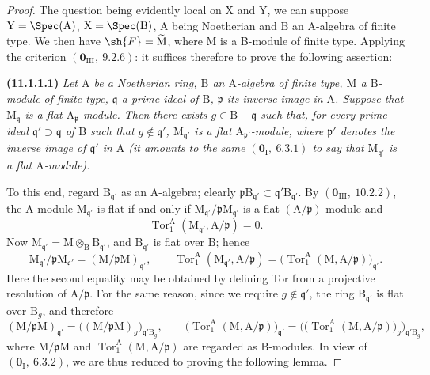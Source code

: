 \begin{proof}
The question being evidently local on $\mathrm{X}$ and $\mathrm{Y}$, we can suppose $\mathrm{Y}=\Spec(\mathrm{A})$, $\mathrm{X}=\Spec(\mathrm{B})$, $\mathrm{A}$ being Noetherian and $\mathrm{B}$ an A-algebra of finite type. We then have $\sh{F}=\widetilde{\mathrm{M}}$, where $\mathrm{M}$ is a B-module of finite type. Applying the criterion $(\mathbf{0}_{\mathrm{III}},~9.2.6)$: it suffices therefore to prove the following assertion:

\medskip
\noindent\textbf{(11.1.1.1)}
\emph{Let $\mathrm{A}$ be a Noetherian ring, $\mathrm{B}$ an $\mathrm{A}$-algebra of finite type, $\mathrm{M}$ a $\mathrm{B}$-module of finite type, $\mathfrak{q}$ a prime ideal of $\mathrm{B}$, $\mathfrak{p}$ its inverse image in $\mathrm{A}$. Suppose that $\mathrm{M}_\mathfrak{q}$ is a flat $\mathrm{A}_\mathfrak{p}$-module. Then there exists $g\in\mathrm{B}-\mathfrak{q}$ such that, for every prime ideal $\mathfrak{q}'\supset\mathfrak{q}$ of $\mathrm{B}$ such that $g\notin\mathfrak{q}'$, $\mathrm{M}_{\mathfrak{q}'}$ is a flat $\mathrm{A}_{\mathfrak{p}'}$-module, where $\mathfrak{p}'$ denotes the inverse image of $\mathfrak{q}'$ in $\mathrm{A}$ (it amounts to the same $(\mathbf{0}_\mathrm{I},~6.3.1)$ to say that $\mathrm{M}_{\mathfrak{q}'}$ is a flat $\mathrm{A}$-module).}
\medskip

To this end, regard $\mathrm{B}_{\mathfrak{q}'}$ as an $\mathrm{A}$-algebra; clearly
$\mathfrak{p}\mathrm{B}_{\mathfrak{q}'}\subset
\mathfrak{q}'\mathrm{B}_{\mathfrak{q}'}$. By
$(\mathbf{0}_{\mathrm{III}},~10.2.2)$, the $\mathrm{A}$-module
$\mathrm{M}_{\mathfrak{q}'}$ is flat if and only if
$\mathrm{M}_{\mathfrak{q}'}/\mathfrak{p}\mathrm{M}_{\mathfrak{q}'}$ is a
flat $(\mathrm{A}/\mathfrak{p})$-module and
\[
  \operatorname{Tor}_1^\mathrm{A}
  (\mathrm{M}_{\mathfrak{q}'},\mathrm{A}/\mathfrak{p})=0.
\]
Now $\mathrm{M}_{\mathfrak{q}'}=
\mathrm{M}\otimes_{\mathrm{B}}\mathrm{B}_{\mathfrak{q}'}$, and
$\mathrm{B}_{\mathfrak{q}'}$ is flat over $\mathrm{B}$; hence
\[
  \mathrm{M}_{\mathfrak{q}'}/\mathfrak{p}\mathrm{M}_{\mathfrak{q}'}
    =(\mathrm{M}/\mathfrak{p}\mathrm{M})_{\mathfrak{q}'},
  \qquad
  \operatorname{Tor}_1^\mathrm{A}
  (\mathrm{M}_{\mathfrak{q}'},\mathrm{A}/\mathfrak{p})
    =\bigl(\operatorname{Tor}_1^\mathrm{A}
      (\mathrm{M},\mathrm{A}/\mathfrak{p})\bigr)_{\mathfrak{q}'}.
\]
Here the second equality may be obtained by defining Tor from a projective
resolution of $\mathrm{A}/\mathfrak{p}$. For the same reason, since we require
$g\notin\mathfrak{q}'$, the ring $\mathrm{B}_{\mathfrak{q}'}$ is flat over
$\mathrm{B}_g$, and therefore
\[
  (\mathrm{M}/\mathfrak{p}\mathrm{M})_{\mathfrak{q}'}
    =\bigl((\mathrm{M}/\mathfrak{p}\mathrm{M})_g
      \bigr)_{\mathfrak{q}'\mathrm{B}_g},
  \qquad
  \bigl(\operatorname{Tor}_1^\mathrm{A}
      (\mathrm{M},\mathrm{A}/\mathfrak{p})\bigr)_{\mathfrak{q}'}
    =\bigl(\bigl(\operatorname{Tor}_1^\mathrm{A}
      (\mathrm{M},\mathrm{A}/\mathfrak{p})\bigr)_g
      \bigr)_{\mathfrak{q}'\mathrm{B}_g},
\]
where $\mathrm{M}/\mathfrak{p}\mathrm{M}$ and
$\operatorname{Tor}_1^\mathrm{A}
(\mathrm{M},\mathrm{A}/\mathfrak{p})$ are regarded as
$\mathrm{B}$-modules. In view of $(\mathbf{0}_\mathrm{I},~6.3.2)$, we are
thus reduced to proving the following lemma.


\end{proof}
